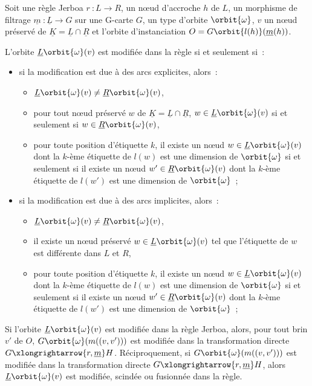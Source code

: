 \begin{proposition}
	Soit une règle Jerboa $r~: L \longrightarrow R$, un nœud d'accroche $h$ de $L$, un morphisme de filtrage $\underline{m}~: \underline{L} \rightarrow G$ sur une G-carte $G$, un type d'orbite $\orbit{\omega}$, $v$ un nœud préservé de $\underline{K} = \underline{L} \cap \underline{R}$ et l'orbite d'instanciation	$O = G\orbit{l(h)}(\underline{m}(h))$.

	L'orbite $\underline{L}\orbit{\omega}(v)$ est modifiée dans la règle si et seulement si~:
	\begin{itemize}
		\item si la modification est due à des arcs explicites, alors~:
		      \begin{itemize}
			      \item $\underline{L}\orbit{\omega}(v) \neq \underline{R}\orbit{\omega}(v)$,
			      \item pour tout n\oe ud préservé $w$ de $\underline{K} = \underline{L} \cap \underline{R}$, $w \in \underline{L}\orbit{\omega}(v)$ si et seulement si $w \in \underline{R}\orbit{\omega}(v)$,
			      \item pour toute position d'étiquette $k$, il existe un n\oe ud $w \in \underline{L}\orbit{\omega}(v)$ dont la $k$-ème étiquette de $l(w)$ est une dimension de $\orbit{\omega}$ si et seulement si il existe un n\oe ud $w' \in \underline{R}\orbit{\omega}(v)$ dont la $k$-ème étiquette de $l(w')$ est une dimension de $\orbit{\omega}$~;
		      \end{itemize}
		\item si la modification est due à des arcs implicites, alors~:
		      \begin{itemize}
			      \item $\underline{L}\orbit{\omega}(v) \neq \underline{R}\orbit{\omega}(v)$,
			      \item il existe un n\oe ud préservé $w \in \underline{L}\orbit{\omega}(v)$ tel que l'étiquette de $w$ est différente dans $L$ et $R$,
			      \item pour toute position d'étiquette $k$, il existe un n\oe ud $w \in \underline{L}\orbit{\omega}(v)$ dont la $k$-ème étiquette de $l(w)$ est une dimension de $\orbit{\omega}$ si et seulement si il existe un n\oe ud $w' \in \underline{R}\orbit{\omega}(v)$ dont la $k$-ème étiquette de $l(w')$ est une dimension de $\orbit{\omega}$~;
		      \end{itemize}
	\end{itemize}


	Si l'orbite $\underline{L}\orbit{\omega}(v)$ est modifiée dans la règle Jerboa, alors, pour tout brin $v'$ de $O$,
	$G\orbit{\omega}(m((v,v')))$ est modifiée dans la transformation directe
	$G \xlongrightarrow{r,\underline{m}} H$. %
	Réciproquement, si 	$G\orbit{\omega}(m((v,v')))$ est modifiée dans la transformation directe
	$G \xlongrightarrow{r,\underline{m}} H$, alors $\underline{L}\orbit{\omega}(v)$ est modifiée, scindée ou fusionnée dans la règle. %
\end{proposition}

